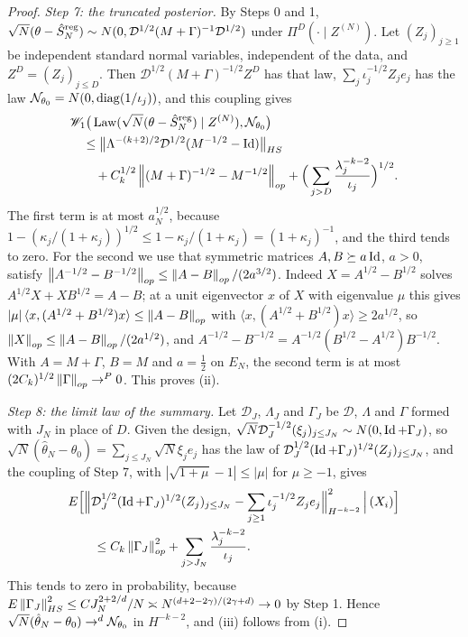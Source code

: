 \begin{proof}
\emph{Step 7: the truncated posterior.} By Steps 0 and 1, $\sqrt N(\theta-\hat S^{\rm reg}_N)\sim N(0,\mathcal D^{1/2}(M+\Gamma)^{-1}\mathcal D^{1/2})$ under $\Pi^D(\cdot\mid Z^{(N)})$. Let $(Z_j)_{j\ge1}$ be independent standard normal variables, independent of the data, and $Z^D=(Z_j)_{j\le D}$. Then $\mathcal D^{1/2}(M+\Gamma)^{-1/2}Z^D$ has that law, $\sum_j\iota_j^{-1/2}Z_je_j$ has the law $\mathcal{N}_{\theta_0}=N(0,\operatorname{diag}(1/\iota_j))$, and this coupling gives
\[
\begin{aligned}
&\mathscr{W}_1\big(\operatorname{Law}(\sqrt N(\theta-\hat S^{\rm reg}_N)\mid Z^{(N)}),\mathcal{N}_{\theta_0}\big)\\
&\quad\le\big\|\Lambda^{-(k+2)/2}\mathcal D^{1/2}(M^{-1/2}-\operatorname{Id})\big\|_{HS}\\
&\qquad+C_k^{1/2}\left\|(M+\Gamma)^{-1/2}-M^{-1/2}\right\|_{op}+\Big(\sum_{j>D}\frac{\lambda_j^{-k-2}}{\iota_j}\Big)^{1/2}.
\end{aligned}
\]
The first term is at most $a_N^{1/2}$, because $1-(\kappa_j/(1+\kappa_j))^{1/2}\le1-\kappa_j/(1+\kappa_j)=(1+\kappa_j)^{-1}$, and the third tends to zero. For the second we use that symmetric matrices $A,B\succeq a\operatorname{Id}$, $a>0$, satisfy $\left\|A^{-1/2}-B^{-1/2}\right\|_{op}\le\left\|A-B\right\|_{op}/(2a^{3/2})$. Indeed $X=A^{1/2}-B^{1/2}$ solves $A^{1/2}X+XB^{1/2}=A-B$; at a unit eigenvector $x$ of $X$ with eigenvalue $\mu$ this gives $|\mu|\,\langle x,(A^{1/2}+B^{1/2})x\rangle\le\left\|A-B\right\|_{op}$ with $\langle x,(A^{1/2}+B^{1/2})x\rangle\ge2a^{1/2}$, so $\left\|X\right\|_{op}\le\left\|A-B\right\|_{op}/(2a^{1/2})$, and $A^{-1/2}-B^{-1/2}=A^{-1/2}(B^{1/2}-A^{1/2})B^{-1/2}$. With $A=M+\Gamma$, $B=M$ and $a=\tfrac12$ on $E_N$, the second term is at most $(2C_k)^{1/2}\left\|\Gamma\right\|_{op}\to^P0$. This proves (ii).

\emph{Step 8: the limit law of the summary.} Let $\mathcal D_J$, $\Lambda_J$ and $\Gamma_J$ be $\mathcal D$, $\Lambda$ and $\Gamma$ formed with $J_N$ in place of $D$. Given the design, $\sqrt N\mathcal D_J^{-1/2}(\xi_j)_{j\le J_N}\sim N(0,\operatorname{Id}+\Gamma_J)$, so $\sqrt N(\hat\theta_N-\theta_0)=\sum_{j\le J_N}\sqrt N\xi_je_j$ has the law of $\mathcal D_J^{1/2}(\operatorname{Id}+\Gamma_J)^{1/2}(Z_j)_{j\le J_N}$, and the coupling of Step 7, with $|\sqrt{1+\mu}-1|\le|\mu|$ for $\mu\ge-1$, gives
\[
\begin{aligned}
&E\Big[\Big\|\mathcal D_J^{1/2}(\operatorname{Id}+\Gamma_J)^{1/2}(Z_j)_{j\le J_N}-\sum_{j\ge1}\iota_j^{-1/2}Z_je_j\Big\|^2_{H^{-k-2}}\,\Big|\,(X_i)\Big]\\
&\qquad\le C_k\left\|\Gamma_J\right\|^2_{op}+\sum_{j>J_N}\frac{\lambda_j^{-k-2}}{\iota_j}.
\end{aligned}
\]
This tends to zero in probability, because $E\left\|\Gamma_J\right\|^2_{HS}\le CJ_N^{2+2/d}/N\asymp N^{(d+2-2\gamma)/(2\gamma+d)}\to0$ by Step 1. Hence $\sqrt N(\hat\theta_N-\theta_0)\to^d\mathcal{N}_{\theta_0}$ in $H^{-k-2}$, and (iii) follows from (i).


\end{proof}

